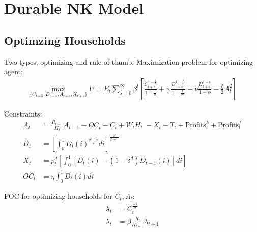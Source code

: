 \documentclass[11pt]{article}
\begin{document}
\section{Durable NK Model}

\subsection{Optimzing Households}

Two types, optimizing and rule-of-thumb. Maximization problem for optimizing agent:
\begin{align*}
	\max_{\{C_{t+s},D_{t+s},A_{t+s},X_{t+s}\}}U = E_t \sum_{s=0}^{\infty}\beta^t \left[\frac{C_{t+s}^{1-\frac{1}{\sigma}}}{1-\frac{1}{\sigma}} + \psi \frac{D_{t+s}^{1-\frac{1}{\sigma^d}}}{1-\frac{1}{\sigma^d}}  - \nu \frac{H_{t+s}^{1+\phi}}{1+\phi} - \frac{\xi}{2}A_t^2\right]
\end{align*}

Constraints:
\begin{align*}
	A_t &= \frac{R_{t-1}}{\Pi_t}A_{t-1} - OC_t  - C_t + W_t H_t\ - X_t  - T_t + \text{Profits}_t^k + \text{Profits}_t^f \\
	D_t &= \left[\int_0^{1} D_t(i)^{\frac{\varphi-1}{\varphi}}di\right]^{\frac{\varphi}{\varphi-1}} \\
	X_t &= p_t^d \left[\int_0^{1}[D_t(i) - (1-\delta^d)D_{t-1}(i) ]di\right] \\
	OC_t &= \eta  \int_0^{1} D_t(i) di 
\end{align*}


FOC for optimizing households for $C_t, A_t$:
\begin{align*}
	\lambda_t &= C_t^{\frac{-1}{\sigma}} \\
	\lambda_t &= \beta \frac{R_t}{\Pi_{t+1}} \lambda_{t+1}  
\end{align*}
\end{document}
